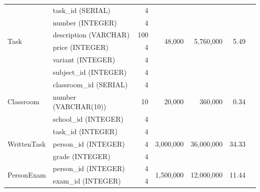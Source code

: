 \documentclass[a4paper]{article}
\begin{document}
\begin{longtable}{|l|p{2cm}|r|r|r|r|r|}
      \multirow{6}{*}{Task}
                        & task\_id (SERIAL)              & 4                     & \multirow{6}{*}{48,000}    & \multirow{6}{*}{5,760,000}    & \multirow{6}{*}{5.49}    \\
                        & number (INTEGER)               & 4                     &                            &                               &                          \\
                        & description (VARCHAR)          & 100                   &                            &                               &                          \\
                        & price (INTEGER)                & 4                     &                            &                               &                          \\
                        & variant (INTEGER)              & 4                     &                            &                               &                          \\
                        & subject\_id (INTEGER)          & 4                     &                            &                               &                          \\ \hline

      \multirow{3}{*}{Classroom}
                        & classroom\_id (SERIAL)         & 4                     & \multirow{3}{*}{20,000}    & \multirow{3}{*}{360,000}      & \multirow{3}{*}{0.34}    \\
                        & number (VARCHAR(10))           & 10                    &                            &                               &                          \\
                        & school\_id (INTEGER)           & 4                     &                            &                               &                          \\ \hline

      \multirow{3}{*}{WrittenTask}
                        & task\_id (INTEGER)             & 4                     & \multirow{3}{*}{3,000,000} & \multirow{3}{*}{36,000,000}   & \multirow{3}{*}{34.33}   \\
                        & person\_id (INTEGER)           & 4                     &                            &                               &                          \\
                        & grade (INTEGER)                & 4                     &                            &                               &                          \\ \hline

      \multirow{2}{*}{PersonExam}
                        & person\_id (INTEGER)           & 4                     & \multirow{2}{*}{1,500,000} & \multirow{2}{*}{12,000,000}   & \multirow{2}{*}{11.44}   \\
                        & exam\_id (INTEGER)             & 4                     &                            &                               &                          \\ \hline
\end{longtable}
\end{document}
